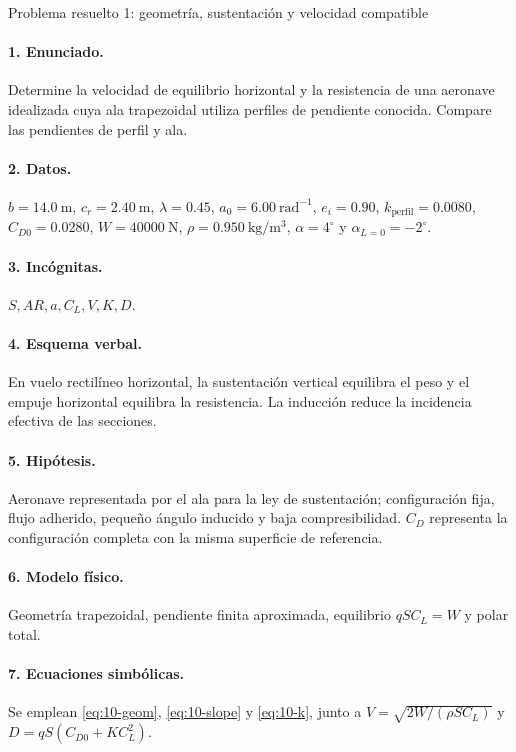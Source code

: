 \begin{studiumworked}{Problema resuelto 1: geometría, sustentación y velocidad compatible}

\paragraph{1. Enunciado.} Determine la velocidad de equilibrio horizontal y la resistencia de una aeronave idealizada cuya ala trapezoidal utiliza perfiles de pendiente conocida. Compare las pendientes de perfil y ala.
\paragraph{2. Datos.} $b=14.0\ \mathrm m$, $c_r=2.40\ \mathrm m$, $\lambda=0.45$, $a_0=6.00\ \mathrm{rad^{-1}}$, $e_i=0.90$, $k_{\mathrm{perfil}}=0.0080$, $C_{D0}=0.0280$, $W=40000\ \mathrm N$, $\rho=0.950\ \mathrm{kg/m^3}$, $\alpha=4^\circ$ y $\alpha_{L=0}=-2^\circ$.
\paragraph{3. Incógnitas.} $S,AR,a,C_L,V,K,D$.
\paragraph{4. Esquema verbal.} En vuelo rectilíneo horizontal, la sustentación vertical equilibra el peso y el empuje horizontal equilibra la resistencia. La inducción reduce la incidencia efectiva de las secciones.
\paragraph{5. Hipótesis.} Aeronave representada por el ala para la ley de sustentación; configuración fija, flujo adherido, pequeño ángulo inducido y baja compresibilidad. $C_D$ representa la configuración completa con la misma superficie de referencia.
\paragraph{6. Modelo físico.} Geometría trapezoidal, pendiente finita aproximada, equilibrio $qSC_L=W$ y polar total.
\paragraph{7. Ecuaciones simbólicas.} Se emplean \eqref{eq:10-geom}, \eqref{eq:10-slope} y \eqref{eq:10-k}, junto a $V=\sqrt{2W/(\rho SC_L)}$ y $D=qS(C_{D0}+KC_L^2)$.

\end{studiumworked}
